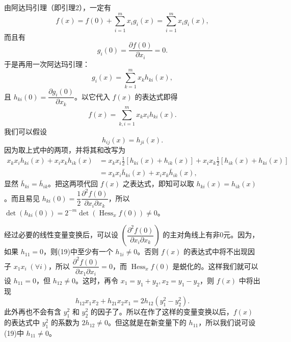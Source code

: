 由阿达玛引理（即引理2），一定有
\[
 f(x)=f(0)+\sum_{i=1}^m x_i g_i(x)=\sum_{i=1}^m x_i g_i(x),
\]
而且有
\[
 g_i(0)=\frac{\partial f(0)}{\partial x_i}=0.
\]
于是再用一次阿达玛引理：
\[
 g_i(x)=\sum_{k=1}^m x_k h_{ki}(x),
\]
且 $h_{ki}(0)=\dfrac{\partial g_i(0)}{\partial x_k}$。以它代入 $f(x)$ 的表达式即得
\begin{equation}
 f(x)=\sum_{k,i=1}^m x_kx_i h_{ki}(x).
 \tag{19}
\end{equation}
我们可以假设
\[
 h_{ij}(x)=h_{ji}(x).
\]
因为取上式中的两项，并将其和改写为
\begin{align*}
 x_kx_i h_{ki}(x)+x_ix_k h_{ik}(x)
 &=x_kx_i\frac12[h_{ki}(x)+h_{ik}(x)]
 +x_ix_k\frac12[h_{ik}(x)+h_{ki}(x)]\\
 &=x_kx_i\bar h_{ki}(x)+x_ix_k\bar h_{ik}(x),
\end{align*}
显然 $\bar h_{ki}=\bar h_{ik}$。把这两项代回 $f(x)$ 之表达式，即知可以取 $h_{ki}(x)=h_{ik}(x)$。而且易见 $h_{ki}(0)=\dfrac12\dfrac{\partial^2f(0)}{\partial x_i\partial x_k}$，所以 $\det(h_{ki}(0))=2^{-m}\det(\operatorname{Hess}_x f(0))\ne0$。

经过必要的线性变量变换后，可以设 $\left(\dfrac{\partial^2f(0)}{\partial x_i\partial x_k}\right)$ 的主对角线上有非0元。因为，如果 $h_{11}=0$，则(19)中至少有一个 $h_{1i}\ne0$。否则 $f(x)$ 的表达式中将不出现因子 $x_1x_i\;(\forall i)$，所以 $\dfrac{\partial^2f(0)}{\partial x_1\partial x_i}=0$，而 $\operatorname{Hess}_x f(0)$ 是蜕化的。这样我们就可以设 $h_{11}=0$，但 $h_{12}\ne0$。这时，再令 $x_1=y_1+y_2,x_2=y_1-y_2$，则 $f(x)$ 中将出现
\[
 h_{12}x_1x_2+h_{21}x_2x_1=2h_{12}(y_1^2-y_2^2).
\]
此外再也不会有含 $y_1^2$ 和 $y_2^2$ 的因子了。所以在作了这样的变量变换以后，$f(x)$ 的表达式中 $y_1^2$ 的系数为 $2h_{12}\ne0$。但这就是在新变量下的 $h_{11}$，所以我们说可设(19)中 $h_{11}\ne0$。

